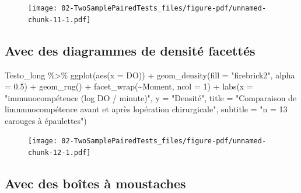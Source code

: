 \documentclass[
  a4paper,
  DIV=11,
  numbers=noendperiod,
  oneside]{scrreprt}
\newenvironment{Shaded}{}{}
\newcommand{\AttributeTok}[1]{\textcolor[rgb]{0.84,0.23,0.29}{#1}}
\newcommand{\DecValTok}[1]{\textcolor[rgb]{0.00,0.36,0.77}{#1}}
\newcommand{\FloatTok}[1]{\textcolor[rgb]{0.00,0.36,0.77}{#1}}
\newcommand{\FunctionTok}[1]{\textcolor[rgb]{0.44,0.26,0.76}{#1}}
\newcommand{\NormalTok}[1]{\textcolor[rgb]{0.14,0.16,0.18}{#1}}
\newcommand{\SpecialCharTok}[1]{\textcolor[rgb]{0.00,0.36,0.77}{#1}}
\newcommand{\StringTok}[1]{\textcolor[rgb]{0.01,0.18,0.38}{#1}}
\begin{document}
\begin{figure}[H]

{\centering \texttt{[image: 02-TwoSamplePairedTests\_files/figure-pdf/unnamed-chunk-11-1.pdf]}

}

\end{figure}

\hypertarget{avec-des-diagrammes-de-densituxe9-facettuxe9s}{%
\subsection{Avec des diagrammes de densité
facettés}\label{avec-des-diagrammes-de-densituxe9-facettuxe9s}}

\begin{Shaded}
\begin{Highlighting}[]
\NormalTok{Testo\_long }\SpecialCharTok{\%\textgreater{}\%}
  \FunctionTok{ggplot}\NormalTok{(}\FunctionTok{aes}\NormalTok{(}\AttributeTok{x =}\NormalTok{ DO)) }\SpecialCharTok{+}
  \FunctionTok{geom\_density}\NormalTok{(}\AttributeTok{fill =} \StringTok{"firebrick2"}\NormalTok{, }\AttributeTok{alpha =} \FloatTok{0.5}\NormalTok{) }\SpecialCharTok{+}
  \FunctionTok{geom\_rug}\NormalTok{() }\SpecialCharTok{+}
  \FunctionTok{facet\_wrap}\NormalTok{(}\SpecialCharTok{\textasciitilde{}}\NormalTok{Moment, }\AttributeTok{ncol =} \DecValTok{1}\NormalTok{) }\SpecialCharTok{+}
  \FunctionTok{labs}\NormalTok{(}\AttributeTok{x =} \StringTok{"immunocompétence (log DO / minute)"}\NormalTok{,}
       \AttributeTok{y =} \StringTok{"Densité"}\NormalTok{,}
       \AttributeTok{title =} \StringTok{"Comparaison de l\textquotesingle{}immunocompétence avant et après l\textquotesingle{}opération chirurgicale"}\NormalTok{,}
       \AttributeTok{subtitle =} \StringTok{"n = 13 carouges à épaulettes"}\NormalTok{)}
\end{Highlighting}
\end{Shaded}

\begin{figure}[H]

{\centering \texttt{[image: 02-TwoSamplePairedTests\_files/figure-pdf/unnamed-chunk-12-1.pdf]}

}

\end{figure}

\hypertarget{avec-des-bouxeetes-uxe0-moustaches}{%
\subsection{Avec des boîtes à
moustaches}\label{avec-des-bouxeetes-uxe0-moustaches}}
\end{document}
